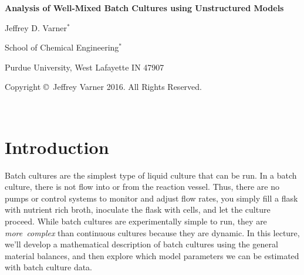 \documentclass[11pt]{article}
\theoremstyle{definition}
\begin{document}
{\par\centering\textbf{\Large Analysis of Well-Mixed Batch Cultures using Unstructured Models}}
\vspace{0.2in}
{\par \centering \large{Jeffrey D. Varner$^{*}$}}
\vspace{0.05in}
{\par \centering \large{School of Chemical Engineering$^{*}$}}
{\par \centering \large{Purdue University, West Lafayette IN 47907}}
\vspace{0.1in}
{\par \centering \small{Copyright \copyright\ Jeffrey Varner 2016. All Rights Reserved.}}\\

\date{}
\thispagestyle{empty}

\setcounter{page}{1}


\section*{Introduction}
Batch cultures are the simplest type of liquid culture that can be run. In a batch culture, there is not flow into or from the reaction vessel.
Thus, there are no pumps or control systems to monitor and adjust flow rates, you simply fill a flask with nutrient rich broth, inoculate the flask with cells, and let the culture proceed.
While batch cultures are experimentally simple to run, they are \textit{more~complex} than continuous cultures because they are dynamic. In this lecture, we'll develop a mathematical description of
batch cultures using the general material balances, and then explore which model parameters we can be estimated with batch culture data.
\end{document}
